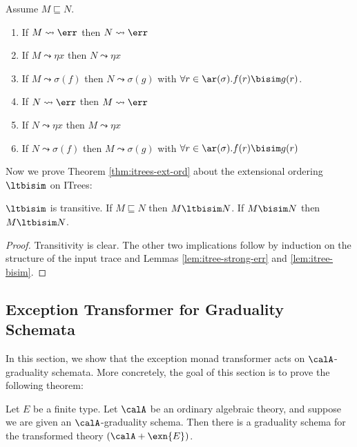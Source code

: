 \begin{lemma}
  \label{lem:itree-bisim}
  Assume $M \sqsubseteq N$.
  \begin{enumerate}
  \item If $M \leadsto \err$ then $N \leadsto \err$
  \item If $M \leadsto \eta x$ then $N \leadsto \eta x$
  \item If $M \leadsto \sigma(f)$ then $N \leadsto \sigma(g)$ with $\forall r\in \ar(\sigma). f(r) \bisim g(r)$.
  \item If $N \leadsto \err$ then $M \leadsto \err$
  \item If $N \leadsto \eta x$ then $M \leadsto \eta x$
  \item If $N \leadsto \sigma(f)$ then $M \leadsto \sigma(g)$ with $\forall r \in \ar(\sigma). f(r) \bisim g(r)$
  \end{enumerate}
\end{lemma}

Now we prove Theorem \ref{thm:itrees-ext-ord} about the extensional ordering $\ltbisim$ on ITrees:
\begin{theorem}
  $\ltbisim$ is transitive.
  If $M \sqsubseteq N$ then $M \ltbisim N$.
  If $M \bisim N$ then $M \ltbisim N$.
\end{theorem}
\begin{proof}
  Transitivity is clear. The other two implications follow by induction on the
  structure of the input trace and Lemmas \ref{lem:itree-strong-err} and
  \ref{lem:itree-bisim}.
\end{proof} 

\subsection{Exception Transformer for Graduality Schemata}

In this section, we show that the exception monad transformer acts on
$\calA$-graduality schemata. More concretely, the goal of this section is to
prove the following theorem:
%
\begin{theorem}
  Let $E$ be a finite type. Let $\calA$ be an ordinary algebraic theory, and
  suppose we are given an $\calA$-graduality schema. Then there is a graduality
  schema for the transformed theory $(\calA + \exn{E})$.
\end{theorem}

